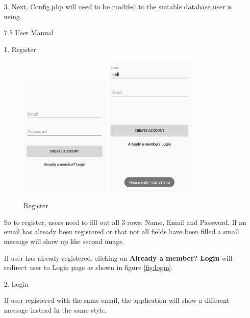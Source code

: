 \documentclass{article}
\begin{document}
\begin{flushleft}
3. Next, Config.php will need to be modifed to the suitable database user is using.\par
{\Large 7.5 User Manual}\par
{\large 1. Register}\par
\clearpage
\begin{figure}[H]
	\includegraphics[width=0.40\textwidth]{register}
	\hfill
	\includegraphics[width=0.40\textwidth]{register2}
	\caption{Register}
	\label{fig:register}
\end{figure}
So to register, users need to fill out all 3 rows: Name, Email and Password. If an email has already been registered or that not all fields have been filled a small message will show up like second image.\par
If user has already registered, clicking on \textbf{Already a member? Login} will redirect user to Login page as shown in figure \ref{fig:login}.\par
{\large 2. Login}\par
If user registered with the same email, the application will show a different message instead in the same style.\par

\end{flushleft}
\end{document}
